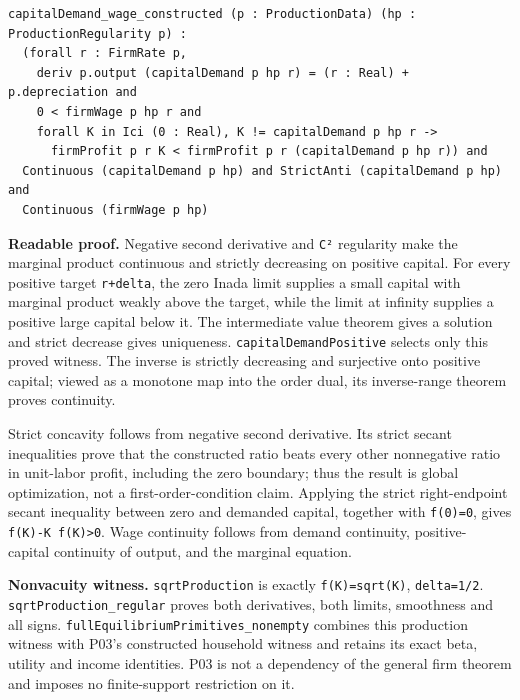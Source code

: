 \documentclass[
  11pt,
]{article}
\let\LedgerOriginalTexttt\texttt
\renewcommand{\texttt}[1]{{\small\LedgerOriginalTexttt{#1}}}
\begin{document}
\begin{verbatim}
capitalDemand_wage_constructed (p : ProductionData) (hp : ProductionRegularity p) :
  (forall r : FirmRate p,
    deriv p.output (capitalDemand p hp r) = (r : Real) + p.depreciation and
    0 < firmWage p hp r and
    forall K in Ici (0 : Real), K != capitalDemand p hp r ->
      firmProfit p r K < firmProfit p r (capitalDemand p hp r)) and
  Continuous (capitalDemand p hp) and StrictAnti (capitalDemand p hp) and
  Continuous (firmWage p hp)
\end{verbatim}

\textbf{Readable proof.} Negative second derivative and \texttt{C²}
regularity make the marginal product continuous and strictly decreasing
on positive capital. For every positive target \texttt{r+delta}, the
zero Inada limit supplies a small capital with marginal product weakly
above the target, while the limit at infinity supplies a positive large
capital below it. The intermediate value theorem gives a solution and
strict decrease gives uniqueness. \texttt{capitalDemandPositive} selects
only this proved witness. The inverse is strictly decreasing and
surjective onto positive capital; viewed as a monotone map into the
order dual, its inverse-range theorem proves continuity.

Strict concavity follows from negative second derivative. Its strict
secant inequalities prove that the constructed ratio beats every other
nonnegative ratio in unit-labor profit, including the zero boundary;
thus the result is global optimization, not a first-order-condition
claim. Applying the strict right-endpoint secant inequality between zero
and demanded capital, together with \texttt{f(0)=0}, gives
\texttt{f(K)-K\ f\textquotesingle{}(K)\textgreater{}0}. Wage continuity
follows from demand continuity, positive- capital continuity of output,
and the marginal equation.

\textbf{Nonvacuity witness.} \texttt{sqrtProduction} is exactly
\texttt{f(K)=sqrt(K)}, \texttt{delta=1/2}.
\texttt{sqrtProduction\_regular} proves both derivatives, both limits,
smoothness and all signs. \texttt{fullEquilibriumPrimitives\_nonempty}
combines this production witness with P03's constructed household
witness and retains its exact beta, utility and income identities. P03
is not a dependency of the general firm theorem and imposes no
finite-support restriction on it.
\end{document}
